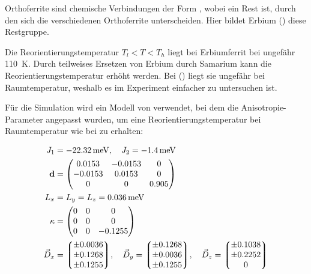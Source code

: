 \documentclass[main.tex]{subfiles}
\begin{document}
Orthoferrite sind chemische Verbindungen der Form , wobei  ein
Rest ist, durch den sich die verschiedenen Orthoferrite unterscheiden. Hier
bildet Erbium () diese Restgruppe.



Die Reorientierungstemperatur \(T_l < T < T_h\) liegt bei Erbiumferrit bei ungefähr \SI{110}{\kelvin}\cite{Deng2015}. Durch teilweises Ersetzen von Erbium durch Samarium kann die Reorientierungstemperatur erhöht werden. Bei () liegt sie ungefähr bei Raumtemperatur, weshalb es im Experiment einfacher zu untersuchen ist.


Für die Simulation wird ein Modell von  verwendet, bei dem die Anisotropie-Parameter angepasst wurden, um eine Reorientierungstemperatur bei Raumtemperatur wie bei  zu erhalten:

\begin{align}
	J_1             & = \SI{-22,32}{\milli\electronvolt}, \quad J_2 =
	\SI{-1,4}{\milli\electronvolt}\label{eq:params-exc}
	\\
	\mathbf{d}      & = \mqty(
	\num{0.0153}    & \num{-0.0153}                                   & 0
	\\
	\num{-0.0153}   & \num{0.0153}                                    & 0
	\\
	0               & 0                                               &
	\num{0.905})\label{eq:params-2a}
	\\
	L_x             & = L_y = L_z = \SI{0.036}{\milli\electronvolt}\label{eq:params-4a}
	\\
	\mathbf{\kappa} & = \mqty(
	0               & 0                                               & 0
	\\
	0               & 0                                               & 0
	\\
	0               & 0                                               &
	\num{-0.1255})\label{eq:params-tia}
	\\
	\vec{D}_x       & = \mqty*(\num{\pm 0.0036}
	\\ \num{\pm 0.1268} \\ \num{\pm
		0.1255}), \quad
	\vec{D}_y = \mqty*(\num{\pm 0.1268}
	\\ \num{\pm 0.0036} \\ \num{\pm
		0.1255}), \quad
	\vec{D}_z = \mqty*(\num{\pm 0.1038}
	\\ \num{\pm 0.2252} \\ 0)\label{eq:params-dmi}
\end{align}
\end{document}
